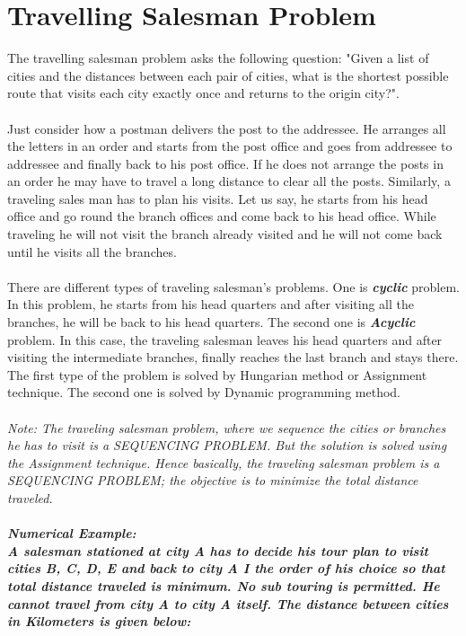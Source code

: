 \section{Travelling Salesman Problem}
The travelling salesman problem asks the following question: "Given a list of cities and the distances between each pair of cities, what is the shortest possible route that visits each city exactly once and returns to the origin city?".\\\\
Just consider how a postman delivers the post to the addressee. He arranges all the letters in an order and starts from the post office and goes from addressee to addressee and finally back to his post office. If he does not arrange the posts in an order he may have to travel a long distance to clear all the posts. Similarly, a traveling sales man has to plan his visits. Let us say, he starts from his head office and go round the branch offices and come back to his head office. While traveling he will not visit the branch already visited and he will not come back until he visits all the branches.
\\\\
There are different types of traveling salesman's problems. One is \textbf{\textit{cyclic}} problem. In this problem, he starts from his head quarters and after visiting all the branches, he will be back to his head quarters. The second one is \textbf{\textit{Acyclic}} problem. In this case, the traveling salesman leaves his head quarters and after visiting the intermediate branches, finally reaches the last branch and stays there. The first type of the problem is solved by Hungarian method or Assignment technique. The second one is solved by Dynamic programming method.\\\\
\textit{Note: The traveling salesman problem, where we sequence the cities or branches he has to visit is a SEQUENCING PROBLEM. But the solution is solved using the Assignment technique. Hence basically, the traveling salesman problem is a SEQUENCING PROBLEM; the objective is to minimize the total distance traveled.}\\\\
\textbf{\textit{Numerical Example:\\
A salesman stationed at city A has to decide his tour plan to visit cities B, C, D, E and back to city A I the order of his choice so that total distance traveled is minimum. No sub touring is permitted. He cannot travel from city A to city A itself. The distance between cities in Kilometers is given below:}}
